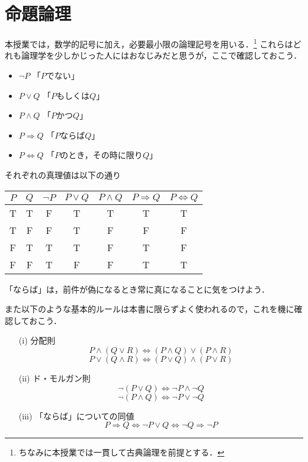 \documentclass[11pt,a4paper]{jsarticle}
\begin{document}
\section{命題論理}
本授業では，数学的記号に加え，必要最小限の論理記号を用いる．\footnote{ちなみに本授業では一貫して古典論理を前提とする．}
これらはどれも論理学を少しかじった人にはおなじみだと思うが，ここで確認しておこう．

\begin{itemize}
 \item $\neg P$ 「$P$でない」
 \item $P \vee Q$ 「$P$もしくは$Q$」
 \item $P \wedge Q$ 「$P$かつ$Q$」
 \item $P \Rightarrow Q$ 「$P$ならば$Q$」
 \item $P \iff Q$ 「$P$のとき，その時に限り$Q$」
\end{itemize}

それぞれの真理値は以下の通り

\begin{table}[h]
\centering
\begin{tabular}{cc|ccccc} \hline
 $P$ & $Q$ & $\neg P$ & $P \vee Q$ & $P \wedge Q$ & $P \Rightarrow Q$ & $P \iff Q$ \\ \hline 
 T  & T & F & T & T & T & T \\
 T  & F & F & T & F & F & F \\
 F  & T & T & T & F & T & F \\
 F  & F & T & F & F & T & T \\ \hline
\end{tabular} 
\end{table}

\begin{attn}
「ならば」は，前件が偽になるとき常に真になることに気をつけよう．
\end{attn}

また以下のような基本的ルールは本書に限らずよく使われるので，これを機に確認しておこう．
\begin{itemize}
    \item[(i)] 分配則
    \[ P \wedge ( Q \vee R ) \iff (P \wedge Q) \vee (P \wedge R) \]
    \[ P \vee ( Q \wedge R ) \iff (P \vee Q) \wedge (P \vee R) \]
    \item[(ii)] ド・モルガン則
    \[ \neg (P \vee Q) \iff \neg P \wedge \neg Q \]
    \[ \neg (P \wedge Q) \iff \neg P \vee \neg Q \]
    \item[(iii)] 「ならば」についての同値
    \[ P \Rightarrow Q \iff \neg P \vee Q \iff \neg Q \Rightarrow \neg P \] 
\end{itemize}
\end{document}
